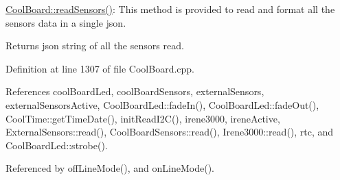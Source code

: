 \hyperlink{class_cool_board_ad03abdce2e65f520bbf2cff0f2d083cf}{Cool\+Board\+::read\+Sensors()}\+: This method is provided to read and format all the sensors data in a single json.

\begin{DoxyReturn}{Returns}
json string of all the sensors read. 
\end{DoxyReturn}


Definition at line 1307 of file Cool\+Board.\+cpp.



References cool\+Board\+Led, cool\+Board\+Sensors, external\+Sensors, external\+Sensors\+Active, Cool\+Board\+Led\+::fade\+In(), Cool\+Board\+Led\+::fade\+Out(), Cool\+Time\+::get\+Time\+Date(), init\+Read\+I2\+C(), irene3000, irene\+Active, External\+Sensors\+::read(), Cool\+Board\+Sensors\+::read(), Irene3000\+::read(), rtc, and Cool\+Board\+Led\+::strobe().



Referenced by off\+Line\+Mode(), and on\+Line\+Mode().

